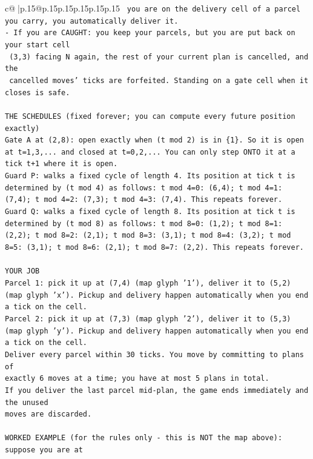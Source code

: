 \documentclass{article}
\begin{document}
{\begin{supertabular}{c@{$\;$}|p{.15\linewidth}@{}p{.15\linewidth}p{.15\linewidth}p{.15\linewidth}p{.15\linewidth}p{.15\linewidth}}
{{{\texttt{     you are on the delivery cell of a parcel you carry, you automatically deliver it.} \\
\texttt{{-} If you are CAUGHT: you keep your parcels, but you are put back on your start cell} \\
\texttt{  (3,3) facing N again, the rest of your current plan is cancelled, and the} \\
\texttt{  cancelled moves' ticks are forfeited. Standing on a gate cell when it closes is safe.} \\
\\ 
\texttt{THE SCHEDULES (fixed forever; you can compute every future position exactly)} \\
\texttt{Gate A at (2,8): open exactly when (t mod 2) is in \{1\}. So it is open at t=1,3,... and closed at t=0,2,... You can only step ONTO it at a tick t+1 where it is open.} \\
\texttt{Guard P: walks a fixed cycle of length 4. Its position at tick t is determined by (t mod 4) as follows: t mod 4=0: (6,4); t mod 4=1: (7,4); t mod 4=2: (7,3); t mod 4=3: (7,4). This repeats forever.} \\
\texttt{Guard Q: walks a fixed cycle of length 8. Its position at tick t is determined by (t mod 8) as follows: t mod 8=0: (1,2); t mod 8=1: (2,2); t mod 8=2: (2,1); t mod 8=3: (3,1); t mod 8=4: (3,2); t mod 8=5: (3,1); t mod 8=6: (2,1); t mod 8=7: (2,2). This repeats forever.} \\
\\ 
\texttt{YOUR JOB} \\
\texttt{Parcel 1: pick it up at (7,4) (map glyph '1'), deliver it to (5,2) (map glyph 'x'). Pickup and delivery happen automatically when you end a tick on the cell.} \\
\texttt{Parcel 2: pick it up at (7,3) (map glyph '2'), deliver it to (5,3) (map glyph 'y'). Pickup and delivery happen automatically when you end a tick on the cell.} \\
\texttt{Deliver every parcel within 30 ticks. You move by committing to plans of} \\
\texttt{exactly 6 moves at a time; you have at most 5 plans in total.} \\
\texttt{If you deliver the last parcel mid{-}plan, the game ends immediately and the unused} \\
\texttt{moves are discarded.} \\
\\ 
\texttt{WORKED EXAMPLE (for the rules only {-} this is NOT the map above): suppose you are at} \\
}}}
\end{supertabular}}
\end{document}
